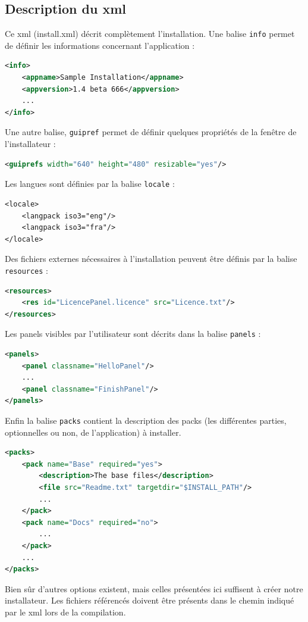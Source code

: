 \subsection{Description du xml}
Ce xml (install.xml) décrit complètement l'installation.
Une balise \verb|info| permet de définir les informations concernant l'application :
\begin{lstlisting}[language=xml]
<info>
	<appname>Sample Installation</appname>
	<appversion>1.4 beta 666</appversion>
	...
</info>
\end{lstlisting}
Une autre balise, \verb|guipref| permet de définir quelques propriétés de la fenêtre de l'installateur :
\begin{lstlisting}[language=xml]
<guiprefs width="640" height="480" resizable="yes"/>
\end{lstlisting}
Les langues sont définies par la balise \verb|locale| :
\begin{lstlisting}
<locale>
	<langpack iso3="eng"/>
	<langpack iso3="fra"/>
</locale>
\end{lstlisting}
Des fichiers externes nécessaires à l'installation peuvent être définis par la balise \verb|resources| :
\begin{lstlisting}[language=xml]
<resources>
	<res id="LicencePanel.licence" src="Licence.txt"/>
</resources>
\end{lstlisting}
Les panels visibles par l'utilisateur sont décrits dans la balise \verb|panels| :
\begin{lstlisting}[language=xml]
<panels>
	<panel classname="HelloPanel"/>
	...
	<panel classname="FinishPanel"/>
</panels>
\end{lstlisting}
Enfin la balise \verb|packs| contient la description des packs (les différentes parties, optionnelles ou non, de l'application) à installer.
\begin{lstlisting}[language=xml]
<packs>
	<pack name="Base" required="yes">
		<description>The base files</description>
		<file src="Readme.txt" targetdir="$INSTALL_PATH"/>
		...
	</pack>
	<pack name="Docs" required="no">
		...
	</pack>
	...
</packs>
\end{lstlisting}
Bien sûr d'autres options existent, mais celles présentées ici suffisent à créer notre installateur.
Les fichiers référencés doivent être présents dans le chemin indiqué par le xml lors de la compilation.
